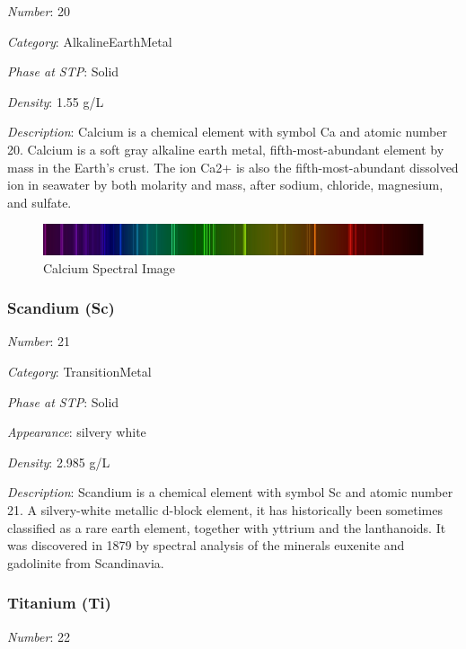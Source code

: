 \documentclass{article}
\begin{document}
\textit{Number}: 20

\textit{Category}: AlkalineEarthMetal

\textit{Phase at STP}: Solid

\textit{Density}: 1.55 g/L

\textit{Description}: Calcium is a chemical element with symbol Ca and atomic number 20. Calcium is a soft gray alkaline earth metal, fifth-most-abundant element by mass in the Earth's crust. The ion Ca2+ is also the fifth-most-abundant dissolved ion in seawater by both molarity and mass, after sodium, chloride, magnesium, and sulfate.

\immediate{}
\begin{figure}[!ht]
    \centering
    \includegraphics[width=12cm]{./resources/spectral_img/Calcium_Spectrum.png}
    \caption{Calcium Spectral Image}
\end{figure}

\hypertarget{subsubsection::Sc}{}\subsubsection{Scandium (Sc)}

\textit{Number}: 21

\textit{Category}: TransitionMetal

\textit{Phase at STP}: Solid

\textit{Appearance}: silvery white

\textit{Density}: 2.985 g/L

\textit{Description}: Scandium is a chemical element with symbol Sc and atomic number 21. A silvery-white metallic d-block element, it has historically been sometimes classified as a rare earth element, together with yttrium and the lanthanoids. It was discovered in 1879 by spectral analysis of the minerals euxenite and gadolinite from Scandinavia.

\hypertarget{subsubsection::Ti}{}\subsubsection{Titanium (Ti)}

\textit{Number}: 22
\end{document}
